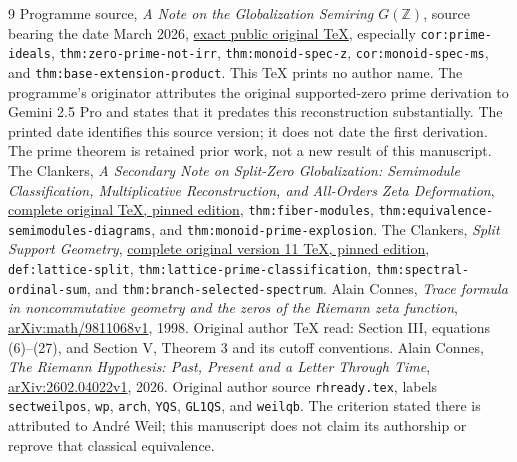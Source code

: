 \documentclass[11pt,a4paper]{article}
\theoremstyle{definition}\newtheorem{definition}[theorem]{Definition}
\newcommand{\Z}{\mathbb Z}\newcommand{\Q}{\mathbb Q}
\begin{document}
\begin{thebibliography}{9}
 Programme source, \emph{A Note on the Globalization Semiring $G(\Z)$}, source bearing the date March 2026, \href{https://github.com/KokunoYumeto/zeta-function-research-reader/blob/d2f0020a7c446f429682925c1c682d99ba86a4cc/workbenches/splitzero-tandem/foundations/globalization-semiring/globalization_note.tex}{exact public original TeX}, especially \texttt{cor:prime-ideals}, \texttt{thm:zero-prime-not-irr}, \texttt{thm:monoid-spec-z}, \texttt{cor:monoid-spec-ms}, and \texttt{thm:base-extension-product}. This TeX prints no author name. The programme's originator attributes the original supported-zero prime derivation to Gemini 2.5 Pro and states that it predates this reconstruction substantially. The printed date identifies this source version; it does not date the first derivation. The prime theorem is retained prior work, not a new result of this manuscript.
 The Clankers, \emph{A Secondary Note on Split-Zero Globalization: Semimodule Classification, Multiplicative Reconstruction, and All-Orders Zeta Deformation}, \href{https://github.com/KokunoYumeto/zeta-function-research-reader/blob/4f0bccd3a0e9d159dbb379bfbe4835054abc298d/workbenches/splitzero-tandem/continuations/20260919-corpus-cohomology-metric-receivers/corpus_sources/split_zero_secondary_note.tex}{complete original TeX, pinned edition}, \texttt{thm:fiber-modules}, \texttt{thm:equivalence-semimodules-diagrams}, and \texttt{thm:monoid-prime-explosion}.
 The Clankers, \emph{Split Support Geometry}, \href{https://github.com/KokunoYumeto/zeta-function-research-reader/blob/a2851f9eb352e7e4376bc629de86fa4ed9c1c434/workbenches/splitzero-tandem/foundations/split-support-geometry-v11/split_support_geometry_arithmetic_curve_v11.tex}{complete original version 11 TeX, pinned edition}, \texttt{def:lattice-split}, \texttt{thm:lattice-prime-classification}, \texttt{thm:spectral-ordinal-sum}, and \texttt{thm:branch-selected-spectrum}.
 Alain Connes, \emph{Trace formula in noncommutative geometry and the zeros of the Riemann zeta function}, \href{https://arxiv.org/abs/math/9811068v1}{arXiv:math/9811068v1}, 1998. Original author TeX read: Section III, equations (6)--(27), and Section V, Theorem 3 and its cutoff conventions.
 Alain Connes, \emph{The Riemann Hypothesis: Past, Present and a Letter Through Time}, \href{https://arxiv.org/abs/2602.04022v1}{arXiv:2602.04022v1}, 2026. Original author source \texttt{rhready.tex}, labels \texttt{sectweilpos}, \texttt{wp}, \texttt{arch}, \texttt{YQS}, \texttt{GL1QS}, and \texttt{weilqb}. The criterion stated there is attributed to Andr\'e Weil; this manuscript does not claim its authorship or reprove that classical equivalence.

\end{thebibliography}
\end{document}
